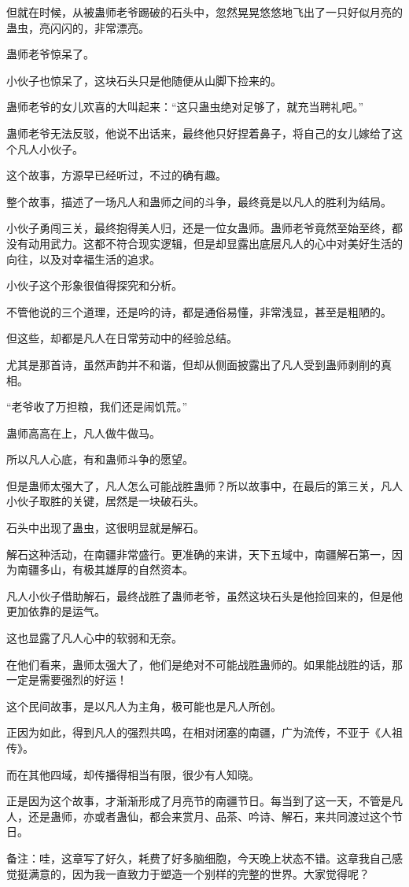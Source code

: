 \begin{this_body}
但就在时候，从被蛊师老爷踢破的石头中，忽然晃晃悠悠地飞出了一只好似月亮的蛊虫，亮闪闪的，非常漂亮。

蛊师老爷惊呆了。

小伙子也惊呆了，这块石头只是他随便从山脚下捡来的。

蛊师老爷的女儿欢喜的大叫起来：“这只蛊虫绝对足够了，就充当聘礼吧。”

蛊师老爷无法反驳，他说不出话来，最终他只好捏着鼻子，将自己的女儿嫁给了这个凡人小伙子。

这个故事，方源早已经听过，不过的确有趣。

整个故事，描述了一场凡人和蛊师之间的斗争，最终竟是以凡人的胜利为结局。

小伙子勇闯三关，最终抱得美人归，还是一位女蛊师。蛊师老爷竟然至始至终，都没有动用武力。这都不符合现实逻辑，但是却显露出底层凡人的心中对美好生活的向往，以及对幸福生活的追求。

小伙子这个形象很值得探究和分析。

不管他说的三个道理，还是吟的诗，都是通俗易懂，非常浅显，甚至是粗陋的。

但这些，却都是凡人在日常劳动中的经验总结。

尤其是那首诗，虽然声韵并不和谐，但却从侧面披露出了凡人受到蛊师剥削的真相。

“老爷收了万担粮，我们还是闹饥荒。”

蛊师高高在上，凡人做牛做马。

所以凡人心底，有和蛊师斗争的愿望。

但是蛊师太强大了，凡人怎么可能战胜蛊师？所以故事中，在最后的第三关，凡人小伙子取胜的关键，居然是一块破石头。

石头中出现了蛊虫，这很明显就是解石。

解石这种活动，在南疆非常盛行。更准确的来讲，天下五域中，南疆解石第一，因为南疆多山，有极其雄厚的自然资本。

凡人小伙子借助解石，最终战胜了蛊师老爷，虽然这块石头是他捡回来的，但是他更加依靠的是运气。

这也显露了凡人心中的软弱和无奈。

在他们看来，蛊师太强大了，他们是绝对不可能战胜蛊师的。如果能战胜的话，那一定是需要强烈的好运！

这个民间故事，是以凡人为主角，极可能也是凡人所创。

正因为如此，得到凡人的强烈共鸣，在相对闭塞的南疆，广为流传，不亚于《人祖传》。

而在其他四域，却传播得相当有限，很少有人知晓。

正是因为这个故事，才渐渐形成了月亮节的南疆节日。每当到了这一天，不管是凡人，还是蛊师，亦或者蛊仙，都会来赏月、品茶、吟诗、解石，来共同渡过这个节日。

备注：哇，这章写了好久，耗费了好多脑细胞，今天晚上状态不错。这章我自己感觉挺满意的，因为我一直致力于塑造一个别样的完整的世界。大家觉得呢？

\end{this_body}

